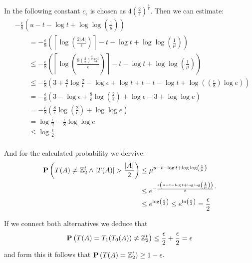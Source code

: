In the following constant $c_{\epsilon}$ is chosen as $4\left(\frac{2}{\epsilon}\right) ^ {\frac{8}{\epsilon}}$. Then we can estimate:
\[
\begin{split}
& -\frac{\epsilon}{8} \left(u - t - \log t + \log \log \left( \frac{1}{\mu} \right) \right) \\
& \qquad = -\frac{\epsilon}{8}\left(\left\lceil\log\left(\frac{2|A|}{\epsilon}\right)\right\rceil - t - \log t + \log\log\left(\frac{1}{\mu}\right)\right) \\
& \qquad \leq -\frac{\epsilon}{8} \left( \left\lceil \log\left( \frac{8 \left(\frac{2}{\epsilon}\right) ^ {\frac{8}{\epsilon}}t2^t}{\epsilon} \right) \right\rceil - t - \log t + \log\log\left(\frac{1}{\mu}\right)\right) \\
& \qquad \leq -\frac{\epsilon}{8} \left(3 + \frac{8}{\epsilon}\log\frac{2}{\epsilon} - \log\epsilon + \log t + t - t - \log t + \log \left( \left(\frac{\epsilon}{8}\right)\log e \right) \right) \\
& \qquad = -\frac{\epsilon}{8} \left(3 - \log\epsilon + \frac{8}{\epsilon} \log \left(\frac{2}{\epsilon}\right) + \log\epsilon - 3 + \log\log e\right) \\
& \qquad = -\frac{\epsilon}{8}\left(\frac{8}{\epsilon}\log\left(\frac{2}{\epsilon}\right) + \log\log e\right) \\
& \qquad = \log \frac{\epsilon}{2} - \frac{\epsilon}{8} \log\log e \\
& \qquad \leq \log\frac{\epsilon}{2} \\
\end{split}
\]

And for the calculated probability we dervive:
\[
\begin{split}
\mathbf{P}\left(T(A) \neq \mathbb{Z}_{2}^{t} \wedge |T(A)| > \frac{|A|}{2}\right) 
	& \leq \mu ^ {u - t - \log t + \log\log\left(\frac{1}{\mu}\right)} \\
	& \leq e ^ {-\frac{\epsilon\left(u - t - \log t + \log\log\left(\frac{1}{\mu}\right)\right)}{8}} \\
	& \leq e ^ {\log \left( \frac{\epsilon}{2} \right)} \leq e ^ {\ln \left(\frac{\epsilon}{2}\right)} = \frac{\epsilon}{2} \\
\end{split} \text{.}
\]

If we connect both alternatives we deduce that 
\[ 
	\mathbf{P}\left(T(A) = T_1(T_0(A)) \neq \mathbb{Z}_{2}^{t}\right) \leq \frac{\epsilon}{2} + \frac{
\epsilon}{2} = \epsilon
\]
and form this it follows that $\mathbf{P}\left(T(A) = \mathbb{Z}_{2}^{t}\right) \geq 1 - \epsilon$.
